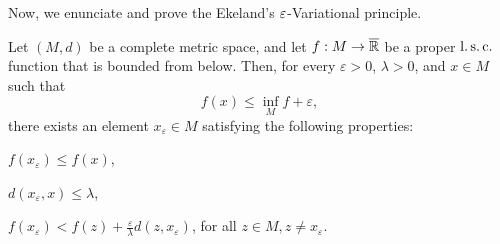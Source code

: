     Now, we enunciate and prove the Ekeland's $\varepsilon$-Variational 
    principle.
    \begin{theorem}\label{thm_evp}
        Let $(M, d)$ be a complete metric space, and let $f : M \to \overline{\mathbb{R}}$ be 
        a proper $\operatorname{l.s.c.}$ function that is bounded from below. Then, 
        for every $\varepsilon > 0$, $\lambda > 0$, and $x \in M$ such that
        $$ 
            f(x) \leq \inf_{M} f + \varepsilon,
        $$
        there exists an element $x_{\varepsilon}\in M$ satisfying the following
        properties:
        \begin{asparaenum}[i)]
            \item 
                $ f(x_{\varepsilon}) \leq f(x)$,
            \item 
                $d(x_{\varepsilon}, x) \leq \lambda$,
            \item
                $f(x_{\varepsilon}) < f(z) + %
                \frac{\varepsilon}{\lambda}d(z,x_{\varepsilon})$, for all 
                $ z\in M, z \neq x_{\varepsilon}$.
        \end{asparaenum}
    \end{theorem}
    
